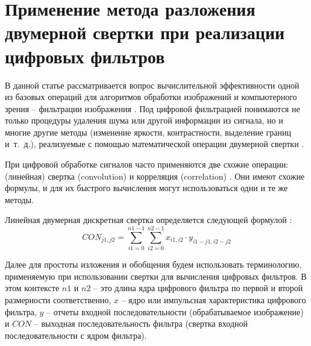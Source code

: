 \section{Применение метода разложения двумерной свертки при реализации цифровых фильтров} \label{sec:ch3/sect5}
В данной статье рассматривается вопрос вычислительной эффективности одной из базовых операций для алгоритмов обработки изображений и компьютерного зрения – фильтрации изображения \cite{Gonzalez2012digital}.
Под цифровой фильтрацией понимаются не только процедуры удаления шума или другой информации из сигнала, но и многие другие методы (изменение яркости, контрастности, выделение границ и~т.~д.), реализуемые с помощью математической операции двумерной свертки \cite{Rabiner1978theory, bluehut1989fast}.


При цифровой обработке сигналов часто применяются две схожие операции: (линейная) свертка (convolution) и корреляция (correlation) \cite{bluehut1989fast, Lukin2002Introduction}. Они имеют схожие формулы, и для их быстрого вычисления могут использоваться одни и те же методы. 


Линейная двумерная дискретная свертка определяется следующей формулой \cite{decomposition_method_application2017}:
\begin{equation}
	\label{eq:equation3.5.1}
	CON_{j1,j2} = \sum_{i1 =0}^{n1-1} \sum_{i2 =0}^{n2-1} x_{i1,i2} \cdot y_{i1-j1,i2-j2}
\end{equation}

Далее для простоты изложения и обобщения будем использовать терминологию, применяемую при использовании свертки для вычисления цифровых фильтров. В этом контексте $n1$ и $n2$ – это длина ядра цифрового фильтра по первой и второй размерности соответственно, $x$ – ядро или импульсная характеристика цифрового фильтра, $y$ – отчеты входной последовательности (обрабатываемое изображение) и $CON$ – выходная последовательность фильтра (свертка входной последовательности с ядром фильтра). 

